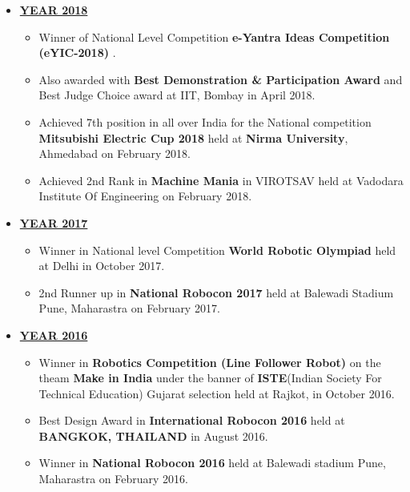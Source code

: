 \documentclass[a4paper,10pt]{article}
\begin{document}
\begin{itemize}
   
   \item \underline {\textbf{YEAR 2018 }}
   \begin{itemize}
   
   \item \noindent Winner of National Level Competition \textbf{ e-Yantra Ideas Competition (eYIC-2018) }.\\
   \item Also awarded with \textbf{ Best Demonstration \& Participation Award } and Best Judge Choice award at IIT, Bombay in April 2018.
   \item \noindent Achieved 7th position in all over India for the National competition \textbf{ Mitsubishi Electric Cup 2018} held at \textbf{ Nirma University}, Ahmedabad on February 2018.
   \item \noindent Achieved 2nd Rank in \textbf{Machine Mania} in VIROTSAV held at Vadodara Institute Of Engineering on February 2018.
   \end{itemize}
   \item \underline {\textbf{YEAR 2017}}
   \begin{itemize}
   
   \item \noindent Winner in National level Competition \textbf{ World Robotic Olympiad} held at Delhi in October 2017.
   \item \noindent 2nd Runner up in \textbf{ National Robocon 2017} held at Balewadi Stadium Pune, Maharastra on February 2017.
   \end{itemize}
   
   \item \underline {\textbf{YEAR 2016}}
   \begin{itemize}
   
   \item \noindent Winner in \textbf{ Robotics Competition (Line Follower Robot) } on the theam \textbf{Make in India} under the banner of \textbf{ISTE}(Indian Society For Technical Education) Gujarat selection held at Rajkot, in October 2016. 
   \item \noindent Best Design Award in \textbf{ International Robocon 2016} held at \textbf{BANGKOK, THAILAND } in August 2016.
   \item \noindent Winner in \textbf{ National Robocon 2016} held at Balewadi stadium Pune, Maharastra on February 2016.
   \end{itemize}
\end{itemize}
\end{document}
